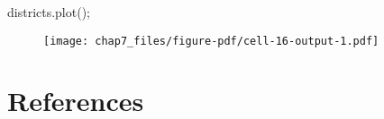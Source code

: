 \documentclass[
  letterpaper,
  DIV=11,
  numbers=noendperiod]{scrreprt}
\newenvironment{Shaded}{\begin{snugshade}}{\end{snugshade}}
\newcommand{\NormalTok}[1]{\textcolor[rgb]{0.00,0.23,0.31}{#1}}
\newcommand{\OperatorTok}[1]{\textcolor[rgb]{0.37,0.37,0.37}{#1}}
\newlength{\cslhangindent}
\newlength{\cslentryspacingunit} %
\newenvironment{CSLReferences}[2] %
 {%
  \setlength{\parindent}{0pt}
  \ifodd #1
  \let\oldpar\par
  \def\par{\hangindent=\cslhangindent\oldpar}
  \fi
  \setlength{\parskip}{#2\cslentryspacingunit}
 }%
 {}
\begin{document}
\begin{Shaded}
\begin{Highlighting}[]
\NormalTok{districts.plot()}\OperatorTok{;}
\end{Highlighting}
\end{Shaded}

\begin{figure}[H]

{\centering \texttt{[image: chap7\_files/figure-pdf/cell-16-output-1.pdf]}

}

\end{figure}


\hypertarget{references}{%
\chapter*{References}\label{references}}


\hypertarget{refs}{}
\begin{CSLReferences}{0}{0}
\end{CSLReferences}
\end{document}
